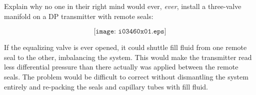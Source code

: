 

Explain why no one in their right mind would ever, {\it ever}, install a three-valve manifold on a DP transmitter with remote seals:

$$\texttt{[image: i03460x01.eps]}$$







If the equalizing valve is ever opened, it could shuttle fill fluid from one remote seal to the other, imbalancing the system.  This would make the transmitter read less differential pressure than there actually was applied between the remote seals.  The problem would be difficult to correct without dismantling the system entirely and re-packing the seals and capillary tubes with fill fluid.










